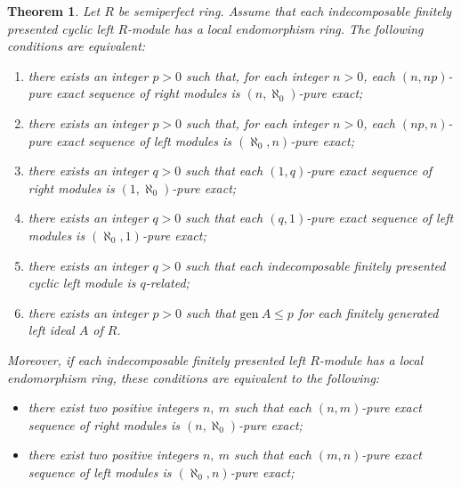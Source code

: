 \documentclass{amsart}
\newtheorem{theorem}{Theorem}[section]
\begin{document}
\begin{theorem}
\label{T:semiperfect} Let $R$ be semiperfect ring. Assume that each indecomposable finitely presented cyclic left $R$-module has a local endomorphism ring. The following conditions are equivalent:
\begin{enumerate}
\item there exists an  integer $p>0$ such that, for each  integer $n>0$, each $(n,np)$-pure exact sequence of right modules is $(n,\aleph_0)$-pure exact;
\item there exists an  integer $p>0$ such that, for each  integer $n>0$, each $(np,n)$-pure exact sequence of left modules is $(\aleph_0,n)$-pure exact;
\item there exists an  integer $q>0$ such that each $(1,q)$-pure exact sequence of right modules is $(1,\aleph_0)$-pure exact;
\item there exists an  integer $q>0$ such that each $(q,1)$-pure exact sequence of left modules is $(\aleph_0,1)$-pure exact;
\item there exists an integer $q>0$ such that each indecomposable finitely presented cyclic left module is $q$-related;
\item there exists an integer $p>0$ such that $\mathrm{gen}\ A\leq p$ for each finitely generated left ideal $A$ of $R$.
\end{enumerate}
Moreover, if each indecomposable finitely presented  left $R$-module has a local endomorphism ring, these conditions are equivalent to the following:
\begin{itemize}
\item[(7)] there exist two positive integers $n,\ m$ such that each $(n,m)$-pure exact sequence of right modules is $(n,\aleph_0)$-pure exact;
\item [(8)] there exist two positive integers $n,\ m$ such that  each $(m,n)$-pure exact sequence of left modules is $(\aleph_0,n)$-pure exact;
\end{itemize}
\end{theorem}
\end{document}
